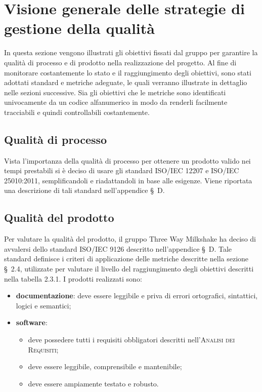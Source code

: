\section{Visione generale delle strategie di gestione della qualità}
In questa sezione vengono illustrati gli obiettivi fissati dal gruppo per garantire la qualità di processo e di prodotto nella realizzazione del progetto.
Al fine di monitorare costantemente lo stato e il raggiungimento degli obiettivi, sono stati adottati standard e metriche adeguate, le quali verranno illustrate in dettaglio nelle sezioni successive.
Sia gli obiettivi che le metriche sono identificati univocamente da un codice alfanumerico in modo da renderli facilmente tracciabili e quindi controllabili costantemente.

\subsection{Qualità di processo}
Vista l’importanza della qualità di processo per ottenere un prodotto valido nei tempi prestabili si è deciso di usare gli standard ISO/IEC 12207 e ISO/IEC 25010:2011, semplificandoli e riadattandoli in base alle esigenze. Viene riportata una descrizione di tali standard nell'appendice \S\ D.

\subsection{Qualità del prodotto}
Per valutare la qualità del prodotto, il gruppo Three Way Milkshake ha deciso di avvalersi dello standard ISO/IEC 9126 descritto nell'appendice \S\ D. Tale standard definisce i criteri di applicazione delle metriche descritte nella sezione \S\ 2.4, utilizzate per valutare il livello del raggiungimento degli obiettivi descritti nella tabella 2.3.1.
I prodotti realizzati sono:
\begin{itemize}
    \item \textbf{documentazione}: deve essere leggibile e priva di errori ortografici, sintattici, logici e semantici;
    \item \textbf{software}: 
    \begin{itemize}
        \item deve possedere tutti i requisiti obbligatori descritti nell'\textsc{Analisi dei Requisiti};
        \item deve essere leggibile, comprensibile e mantenibile;
        \item deve essere ampiamente testato e robusto.
    \end{itemize}
\end{itemize}

